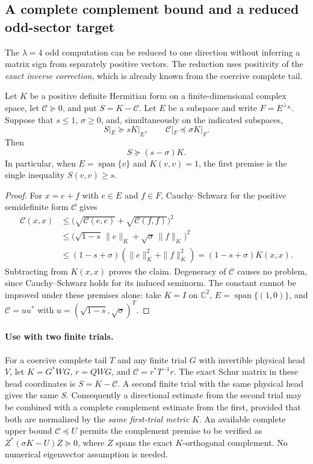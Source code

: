 \subsection*{A complete complement bound and a reduced odd-sector target}

The $\lambda=4$ odd computation can be reduced to one direction
without inferring a matrix sign from separately positive vectors.
The reduction uses positivity of the \emph{exact inverse correction},
which is already known from the coercive complete tail.

\begin{proposition}
\label{prop:v126-direction-complement}
Let $K$ be a positive definite Hermitian form on a finite-dimensional
complex space, let $\mathcal C\succeq0$, and put $S=K-\mathcal C$.
Let $E$ be a subspace and write $F=E^{\perp_K}$.
Suppose that $s\leq1$, $\sigma\geq0$, and, simultaneously on the
indicated subspaces,
\[
 S|_E\succeq sK|_E,
 \qquad \mathcal C|_F\preceq\sigma K|_F.
\]
Then
\[
 S\succeq(s-\sigma)K.
\]
In particular, when $E=\operatorname{span}\{v\}$ and $K(v,v)=1$,
the first premise is the single inequality $S(v,v)\geq s$.
\end{proposition}
\begin{proof}
For $x=e+f$ with $e\in E$ and $f\in F$, Cauchy--Schwarz for the
positive semidefinite form $\mathcal C$ gives
\begin{align*}
 \mathcal C(x,x)
 &\leq\bigl(\sqrt{\mathcal C(e,e)}+
                 \sqrt{\mathcal C(f,f)}\bigr)^2\\
 &\leq\bigl(\sqrt{1-s}\,\|e\|_K+
                 \sqrt{\sigma}\,\|f\|_K\bigr)^2\\
 &\leq(1-s+\sigma)(\|e\|_K^2+\|f\|_K^2)
  =(1-s+\sigma)K(x,x).
\end{align*}
Subtracting from $K(x,x)$ proves the claim.  Degeneracy of
$\mathcal C$ causes no problem, since Cauchy--Schwarz holds for
its induced seminorm.  The constant cannot be improved under
these premises alone: take $K=I$ on $\mathbb C^2$,
$E=\operatorname{span}\{(1,0)\}$, and
$\mathcal C=uu^*$ with $u=(\sqrt{1-s},\sqrt{\sigma})^T$.
\end{proof}

\paragraph{Use with two finite trials.}
For a coercive complete tail $T$ and any finite trial $G$ with
invertible physical head $V$, let
$K=G^*WG$, $r=QWG$, and $\mathcal C=r^*T^{-1}r$.
The exact Schur matrix in these head coordinates is $S=K-\mathcal C$.
A second finite trial with the same physical head gives the same $S$.
Consequently a directional estimate from the second trial may be combined
with a complete complement estimate from the first, provided that both
are normalized by the \emph{same first-trial metric} $K$.
An available complete upper bound $\mathcal C\preceq U$ permits the
complement premise to be verified as
$Z^*(\sigma K-U)Z\succeq0$, where $Z$ spans the exact
$K$-orthogonal complement.  No numerical eigenvector assumption is needed.


